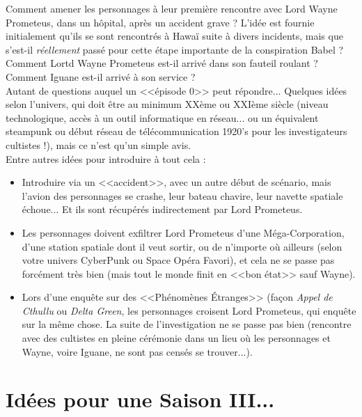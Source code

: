 \documentclass[11pt,twoside,a4paper]{book}
\begin{document}
Comment amener les personnages {\`a} leur premi{\`e}re rencontre avec Lord Wayne Prometeus, dans un h{\^o}pital, apr{\`e}s un accident grave ? L'id{\'e}e est fournie initialement qu'ils se sont rencontr{\'e}s {\`a} Hawa{\"i} suite {\`a} divers incidents, mais que s'est-il \emph{r{\'e}ellement} pass{\'e} pour cette {\'e}tape importante de la conspiration Babel ? Comment Lortd Wayne Prometeus est-il arriv{\'e} dans son fauteil roulant ? Comment Iguane est-il arriv{\'e} {\`a} son service ? ~\\

Autant de questions auquel un <<{\'e}pisode 0>> peut r{\'e}pondre... Quelques id{\'e}es selon l'univers, qui doit {\^e}tre au minimum XX{\`e}me ou XXI{\`e}me si{\`e}cle (niveau technologique, acc{\`e}s {\`a} un outil informatique en r{\'e}seau... ou un {\'e}quivalent steampunk ou d{\'e}but r{\'e}seau de t{\'e}l{\'e}communication 1920's pour les investigateurs cultistes !), mais ce n'est qu'un simple avis. ~\\

Entre autres id{\'e}es pour introduire {\`a} tout cela : 
\begin{itemize}
	\item Introduire via un <<accident>>, avec un autre d{\'e}but de sc{\'e}nario, mais l'avion des personnages se crashe, leur bateau chavire, leur navette spatiale {\'e}choue... Et ils sont r{\'e}cup{\'e}r{\'e}s indirectement par Lord Prometeus. 
	\item Les personnages doivent exfiltrer Lord Prometeus d'une M{\'e}ga-Corporation, d'une station spatiale dont il veut sortir, ou de n'importe o{\`u} ailleurs (selon votre univers CyberPunk ou Space Op{\'e}ra Favori), et cela ne se passe pas forc{\'e}ment tr{\`e}s bien (mais tout le monde finit en <<bon {\'e}tat>> sauf Wayne). 
	\item Lors d'une enqu{\^e}te sur des <<Ph{\'e}nom{\`e}nes {\'E}tranges>> (fa\c{c}on \emph{Appel de Cthullu} ou \emph{Delta Green}, les personnages croisent Lord Prometeus, qui enqu{\^e}te sur la m{\^e}me chose. La suite de l'investigation ne se passe pas bien (rencontre avec des cultistes en pleine c{\'e}r{\'e}monie dans un lieu o{\`u} les personnages et Wayne, voire Iguane, ne sont pas cens{\'e}s se trouver...). 
\end{itemize}

\clearpage

\section*{Id{\'e}es pour une Saison III...}
\end{document}
